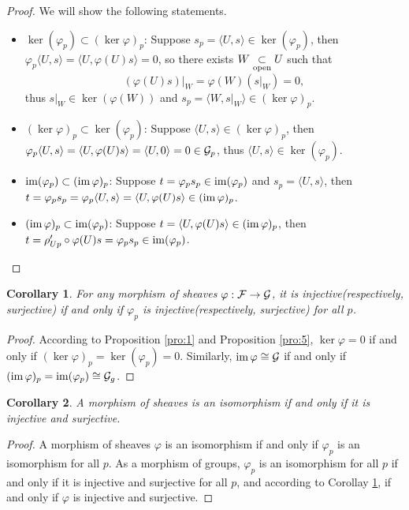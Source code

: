\documentclass[9pt]{extarticle}
\theoremstyle{plain}
\newtheorem{cor}{Corollary}
\begin{document}
\begin{proof}
We will show the following statements.
	\begin{itemize}
		\item $\ker(\varphi_p)\subset (\ker \varphi)_p$: Suppose $s_p=\langle U,s\rangle\in \ker(\varphi_p)$, then $\varphi_p\langle U,s\rangle=\langle U,\varphi(U)s\rangle=0$, so there exists $W\underset{\mathrm{open}}{\subset} U$ such that 
		\[
			(\varphi(U)s)|_W=\varphi(W)(s|_W)=0,
		\]
		thus $s|_W\in \ker(\varphi(W))$ and $s_p=\langle W,s|_W\rangle\in (\ker \varphi)_p$.

		\item $(\ker \varphi)_p\subset\ker(\varphi_p)$: Suppose $\langle U,s\rangle\in (\ker \varphi)_p$, then $\varphi_p\langle U,s\rangle=\langle U,\varphi(U)s\rangle=\langle U,0\rangle=0\in \mathcal{G}_p$, thus $\langle U,s\rangle\in \ker(\varphi_p)$.

		\item $\operatorname{im}(\varphi_p)\subset (\operatorname{im} \varphi)_p$: Suppose $t=\varphi_ps_p\in\operatorname{im} (\varphi_p)$ and $s_p=\langle U,s\rangle$, then $t=\varphi_ps_p=\varphi_p\langle U,s\rangle=\langle U,\varphi(U)s\rangle\in (\operatorname{im} \varphi)_p$.

		\item $(\operatorname{im} \varphi)_p\subset \operatorname{im}(\varphi_p)$: Suppose $t=\langle U,\varphi(U)s\rangle\in (\operatorname{im} \varphi)_p$, then $t=\rho'_{Up}\circ\varphi(U)s=\varphi_p s_p \in \operatorname{im}(\varphi_p)$.
	\end{itemize}
\end{proof}
\begin{cor}
	For any morphism of sheaves $\varphi:\mathcal{F}\to\mathcal{G}$, it is injective(respectively, surjective) if and only if $\varphi_p$ is injective(respectively, surjective) for all $p$.
	\label{cor:1}
\end{cor}
\begin{proof}
	According to Proposition \ref{pro:1} and Proposition \ref{pro:5}, $\ker \varphi=0$ if and only if $(\ker \varphi)_p=\ker(\varphi_p)=0$. Similarly, $\operatorname{im} \varphi\cong \mathcal{G}$ if and only if $(\operatorname{im} \varphi)_p=\operatorname{im}(\varphi_p)\cong \mathcal{G}_g$.
\end{proof}
\begin{cor}
	A morphism of sheaves is an isomorphism if and only if it is injective and surjective.
\end{cor}
\begin{proof}
	A morphism of sheaves $\varphi$ is an isomorphism if and only if $\varphi_p$ is an isomorphism for all $p$. As a morphism of groups, $\varphi_p$ is an isomorphism for all $p$ if and only if it is injective and surjective for all $p$, and according to Corollay \ref{cor:1}, if and only if $\varphi$ is injective and surjective.
\end{proof}
\end{document}
